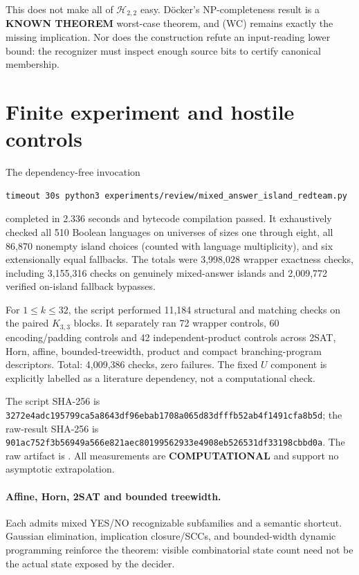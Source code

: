 \documentclass[11pt]{article}
\newcommand{\Htwo}{\mathcal H_{2,2}}
\newcommand{\KNOWN}{\textbf{KNOWN THEOREM}}
\newcommand{\COMP}{\textbf{COMPUTATIONAL}}
\begin{document}
This does not make all of $\Htwo$ easy.  D\"ocker's NP-completeness result is a
\KNOWN{} worst-case theorem, and (WC) remains exactly the missing implication.
Nor does the construction refute an input-reading lower bound: the recognizer
must inspect enough source bits to certify canonical membership.

\section{Finite experiment and hostile controls}

The dependency-free invocation
\begin{verbatim}
timeout 30s python3 experiments/review/mixed_answer_island_redteam.py
\end{verbatim}
completed in 2.336 seconds and bytecode compilation passed.  It exhaustively
checked all 510 Boolean languages on universes of sizes one through eight, all
86,870 nonempty island choices (counted with language multiplicity), and six
extensionally equal fallbacks.  The totals were 3,998,028 wrapper exactness
checks, including 3,155,316 checks on genuinely mixed-answer islands and
2,009,772 verified on-island fallback bypasses.

For $1\le k\le32$, the script performed 11,184 structural and matching checks
on the paired $K_{3,3}$ blocks.  It separately ran 72 wrapper controls, 60
encoding/padding controls and 42 independent-product controls across 2SAT,
Horn, affine, bounded-treewidth, product and compact branching-program
descriptors.  Total: 4,009,386 checks, zero failures.  The fixed $U$ component
is explicitly labelled as a literature dependency, not a computational check.

The script SHA-256 is
\nolinkurl{3272e4adc195799ca5a8643df96ebab1708a065d83dfffb52ab4f1491cfa8b5d};
the raw-result SHA-256 is
\nolinkurl{901ac752f3b56949a566e821aec80199562933e4908eb526531df33198cbbd0a}.  The raw
artifact is
.
All measurements are \COMP{} and support no asymptotic extrapolation.

\paragraph{Affine, Horn, 2SAT and bounded treewidth.}
Each admits mixed YES/NO recognizable subfamilies and a semantic shortcut.
Gaussian elimination, implication closure/SCCs, and bounded-width dynamic
programming reinforce the theorem: visible combinatorial state count need not
be the actual state exposed by the decider.
\end{document}

